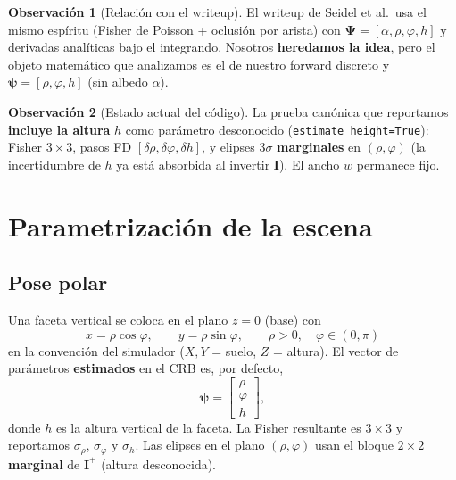 \documentclass[11pt,a4paper]{article}
\theoremstyle{definition}
\newtheorem{remark}{Observaci\'on}
\newcommand{\vect}[1]{\boldsymbol{#1}}
\newcommand{\matr}[1]{\mathbf{#1}}
\begin{document}
\begin{remark}[Relaci\'on con el writeup]
El writeup de Seidel et al.\ usa el mismo esp\'iritu (Fisher de Poisson +
oclusi\'on por arista) con $\vect{\Psi}=[\alpha,\rho,\varphi,h]$ y derivadas
anal\'iticas bajo el integrando.
Nosotros \textbf{heredamos la idea}, pero el objeto matem\'atico que
analizamos es el de nuestro forward discreto y
$\vect{\psi}=[\rho,\varphi,h]$ (sin albedo $\alpha$).
\end{remark}

\begin{remark}[Estado actual del c\'odigo]
La prueba can\'onica que reportamos \textbf{incluye la altura} $h$ como
par\'ametro desconocido (\texttt{estimate\_height=True}): Fisher $3\times 3$,
pasos FD $[\delta\rho,\delta\varphi,\delta h]$, y elipses $3\sigma$
\textbf{marginales} en $(\rho,\varphi)$ (la incertidumbre de $h$ ya est\'a
absorbida al invertir $\matr{I}$). El ancho $w$ permanece fijo.
\end{remark}

\section{Parametrizaci\'on de la escena}
\label{sec:param}

\subsection{Pose polar}
Una faceta vertical se coloca en el plano $z=0$ (base) con
\begin{equation}
    x = \rho\cos\varphi,
    \qquad
    y = \rho\sin\varphi,
    \qquad
    \rho>0,\quad \varphi\in(0,\pi)
    \label{eq:polar}
\end{equation}
en la convenci\'on del simulador ($X,Y$ = suelo, $Z$ = altura).
El vector de par\'ametros \textbf{estimados} en el CRB es, por defecto,
\begin{equation}
    \vect{\psi}
    =
    \begin{bmatrix}\rho\\ \varphi\\ h\end{bmatrix},
    \label{eq:psi}
\end{equation}
donde $h$ es la altura vertical de la faceta.
La Fisher resultante es $3\times 3$ y reportamos
$\sigma_\rho$, $\sigma_\varphi$ y $\sigma_h$.
Las elipses en el plano $(\rho,\varphi)$ usan el bloque $2\times 2$
\textbf{marginal} de $\matr{I}^{+}$ (altura desconocida).
\end{document}
